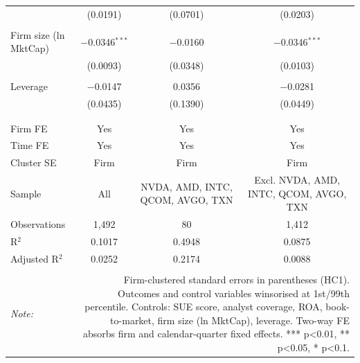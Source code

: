 \begin{table}[!htbp]
\begin{tabular}{@{\extracolsep{5pt}}lccc}
  & (0.0191) & (0.0701) & (0.0203) \\ 
  & & & \\ 
 Firm size (ln MktCap) & $-$0.0346$^{***}$ & $-$0.0160 & $-$0.0346$^{***}$ \\ 
  & (0.0093) & (0.0348) & (0.0103) \\ 
  & & & \\ 
 Leverage & $-$0.0147 & 0.0356 & $-$0.0281 \\ 
  & (0.0435) & (0.1390) & (0.0449) \\ 
  & & & \\ 
\hline \\[-1.8ex] 
Firm FE & Yes & Yes & Yes \\ 
Time FE & Yes & Yes & Yes \\ 
Cluster SE & Firm & Firm & Firm \\ 
Sample & All & NVDA, AMD, INTC, QCOM, AVGO, TXN & Excl. NVDA, AMD, INTC, QCOM, AVGO, TXN \\ 
Observations & 1,492 & 80 & 1,412 \\ 
R$^{2}$ & 0.1017 & 0.4948 & 0.0875 \\ 
Adjusted R$^{2}$ & 0.0252 & 0.2174 & 0.0088 \\ 
\hline 
\hline \\[-1.8ex] 
\textit{Note:}  & \multicolumn{3}{r}{Firm-clustered standard errors in parentheses (HC1). Outcomes and control variables winsorised at 1st/99th percentile. Controls: SUE score, analyst coverage, ROA, book-to-market, firm size (ln MktCap), leverage. Two-way FE absorbs firm and calendar-quarter fixed effects. *** p<0.01, ** p<0.05, * p<0.1.} \\ 
\end{tabular} 
\end{table} 
